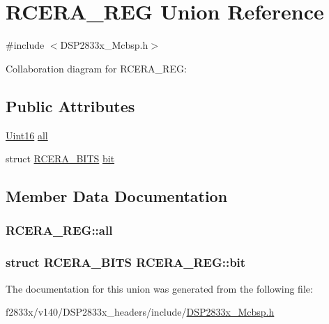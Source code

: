 \hypertarget{union_r_c_e_r_a___r_e_g}{}\section{R\+C\+E\+R\+A\+\_\+\+R\+E\+G Union Reference}
\label{union_r_c_e_r_a___r_e_g}


{\ttfamily \#include $<$D\+S\+P2833x\+\_\+\+Mcbsp.\+h$>$}



Collaboration diagram for R\+C\+E\+R\+A\+\_\+\+R\+E\+G\+:
\subsection*{Public Attributes}
\begin{DoxyCompactItemize}
\item 
\hyperlink{_d_s_p2833x___device_8h_a59a9f6be4562c327cbfb4f7e8e18f08b}{Uint16} \hyperlink{union_r_c_e_r_a___r_e_g_a06ffef10d3a1207b5452aa740e1b1367}{all}
\item 
struct \hyperlink{struct_r_c_e_r_a___b_i_t_s}{R\+C\+E\+R\+A\+\_\+\+B\+I\+T\+S} \hyperlink{union_r_c_e_r_a___r_e_g_acc269b3e375ce9298ea34ef516c3e4f7}{bit}
\end{DoxyCompactItemize}


\subsection{Member Data Documentation}
\hypertarget{union_r_c_e_r_a___r_e_g_a06ffef10d3a1207b5452aa740e1b1367}{}
\subsubsection[{all}]{ R\+C\+E\+R\+A\+\_\+\+R\+E\+G\+::all}\label{union_r_c_e_r_a___r_e_g_a06ffef10d3a1207b5452aa740e1b1367}
\hypertarget{union_r_c_e_r_a___r_e_g_acc269b3e375ce9298ea34ef516c3e4f7}{}
\subsubsection[{bit}]{\setlength{\rightskip}{0pt plus 5cm}struct {\bf R\+C\+E\+R\+A\+\_\+\+B\+I\+T\+S} R\+C\+E\+R\+A\+\_\+\+R\+E\+G\+::bit}\label{union_r_c_e_r_a___r_e_g_acc269b3e375ce9298ea34ef516c3e4f7}


The documentation for this union was generated from the following file\+:\begin{DoxyCompactItemize}
\item 
f2833x/v140/\+D\+S\+P2833x\+\_\+headers/include/\hyperlink{_d_s_p2833x___mcbsp_8h}{D\+S\+P2833x\+\_\+\+Mcbsp.\+h}\end{DoxyCompactItemize}
